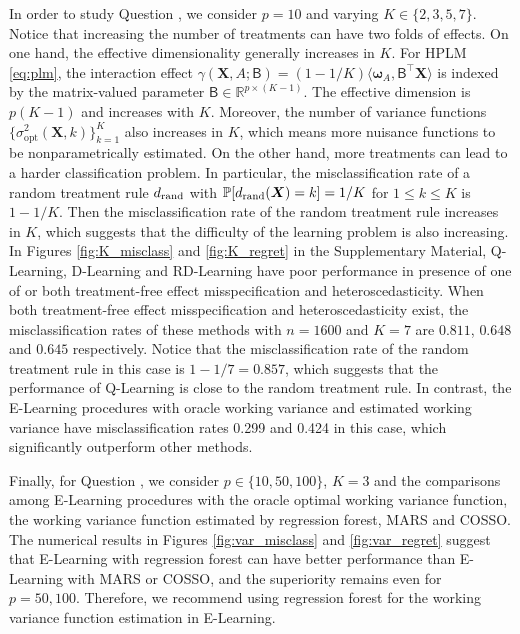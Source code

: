 \documentclass[11pt]{article}
\theoremstyle{definition}
\theoremstyle{remark}
\newcommand{\bX}{\bm{X}}
\newcommand{\bomega}{\bm{\omega}}
\newcommand{\bbP}{\mathbb{P}}
\newcommand{\bbR}{\mathbb{R}}
\newcommand{\sfB}{\mathsf{B}}
\newcommand{\opt}{\mathrm{opt}}
\begin{document}
In order to study Question , we consider $ p = 10 $ and varying $ K \in \{2,3,5,7\} $. Notice that increasing the number of treatments can have two folds of effects. On one hand, the effective dimensionality generally increases in $ K $. For HPLM \eqref{eq:plm}, the interaction effect $ \gamma(\bX,A;\sfB) = (1-1/K)\langle \bomega_{A},\sfB^{\intercal}\bX \rangle $ is indexed by the matrix-valued parameter $ \sfB \in \bbR^{p\times(K-1)} $. The effective dimension is $ p(K-1) $ and increases with $ K $. Moreover, the number of variance functions $ \{\sigma_{\opt}^{2}(\bX,k)\}_{k=1}^{K} $ also increases in $ K $, which means more nuisance functions to be nonparametrically estimated. On the other hand, more treatments can lead to a harder classification problem. In particular, the misclassification rate of a random treatment rule $ d_{\rm rand} $ with $ \bbP[d_{\rm rand}(\bX) = k] = 1/K $ for $ 1 \le k \le K $ is $ 1 - 1/K $. Then the misclassification rate of the random treatment rule increases in $ K $, which suggests that the difficulty of the learning problem is also increasing. In Figures \ref{fig:K_misclass} and \ref{fig:K_regret} in the Supplementary Material, Q-Learning, D-Learning and RD-Learning have poor performance in presence of one of or both treatment-free effect misspecification and heteroscedasticity. When both treatment-free effect misspecification and heteroscedasticity exist, the misclassification rates of these methods with $ n = 1600 $ and $ K = 7 $ are $ 0.811 $, $ 0.648 $ and $ 0.645 $ respectively. Notice that the misclassification rate of the random treatment rule in this case is $ 1 - 1/7 = 0.857 $, which suggests that the performance of Q-Learning is close to the random treatment rule. In contrast, the E-Learning procedures with oracle working variance and estimated working variance have misclassification rates 0.299 and 0.424 in this case, which significantly outperform other methods. 

Finally, for Question , we consider $ p \in \{ 10, 50, 100 \} $, $ K = 3 $ and the comparisons among E-Learning procedures with the oracle optimal working variance function, the working variance function estimated by regression forest, MARS and COSSO. The numerical results in Figures \ref{fig:var_misclass} and \ref{fig:var_regret} suggest that E-Learning with regression forest can have better performance than E-Learning with MARS or COSSO, and the superiority remains even for $ p = 50,100 $. Therefore, we recommend using regression forest for the working variance function estimation in E-Learning.
\end{document}
